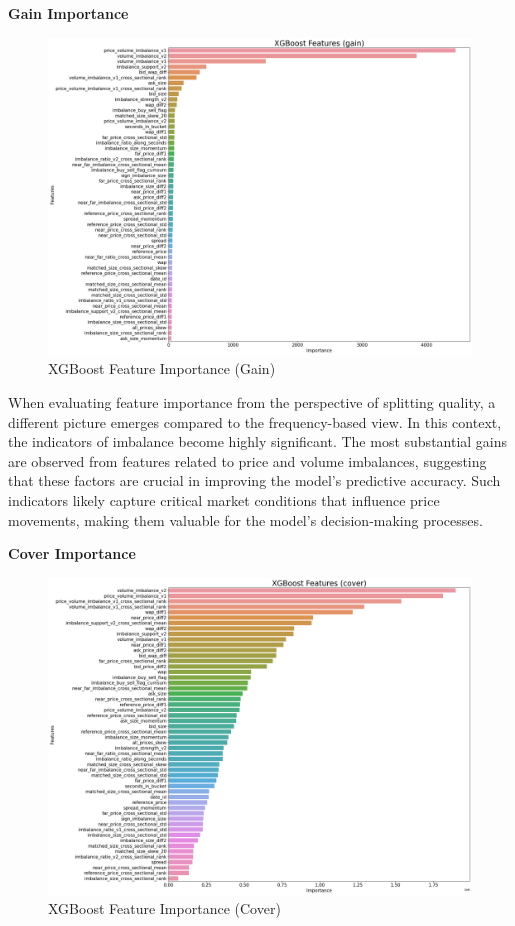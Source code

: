 \documentclass[12pt]{article}
\newtheorem{Proof of Lemma}{Proof of Lemma}
\begin{document}
\noindent \textbf{Gain Importance}
\begin{figure}[H]
  \centering
  \includegraphics[width=1\linewidth]{images/xgb_gain.png}
  \caption{XGBoost Feature Importance (Gain)}
  \label{fig:xgb_gain}
\end{figure}
When evaluating feature importance from the perspective of splitting quality, a different picture emerges compared to the frequency-based view. In this context, the indicators of imbalance become highly significant. The most substantial gains are observed from features related to price and volume imbalances, suggesting that these factors are crucial in improving the model's predictive accuracy. Such indicators likely capture critical market conditions that influence price movements, making them valuable for the model's decision-making processes.
\newline

\noindent \textbf{Cover Importance}
\begin{figure}[H]
  \centering
  \includegraphics[width=1\linewidth]{images/xgb_cover.png}
  \caption{XGBoost Feature Importance (Cover)}
  \label{fig:xgb_cover}
\end{figure}
\end{document}
